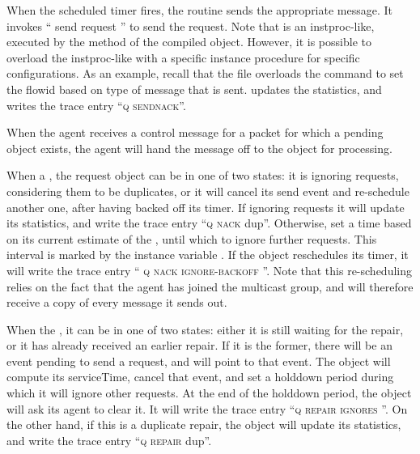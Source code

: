 {When the scheduled timer fires, the routine
sends the appropriate message.
It invokes `` send request '' to send the request.
Note that  is an instproc-like,
executed by the  method of the compiled object.
However, it is possible to overload the instproc-like
with a specific instance procedure 
for specific configurations.
As an example, recall that the file 
overloads the  command
to set the flowid based on type of message that is sent.
 updates the statistics, and writes the trace entry
``\textsc{q sendnack}''.

When the agent receives a control message for a packet
for which a pending object exists,
the agent will hand the message off to the object for processing.
\begin{list}{}{}
\item When a 
  ,
  the request object can be in one of two states:
  it is ignoring requests, considering them to be duplicates, or
  it will cancel its send event and re-schedule another one,
  after having backed off its timer.
  If ignoring requests it will update its statistics,
  and write the trace entry ``\textsc{q nack } dup''.
  Otherwise, set a time based on its current estimate of the ,
  until which to ignore further requests.
  This interval is marked by the instance variable .
  If the object reschedules its timer, it will write the trace entry
  ``\textsc{ q nack ignore-backoff } ''.
  Note that this re-scheduling relies on the fact that
  the agent has joined the multicast group, and will therefore
  receive a copy of every message it sends out.
  
\item When the
  ,
  it can be in one of two states:
  either it is still waiting for the repair,
  or it has already received an earlier repair.
  If it is the former, there will be an event pending
  to send a request, and  will point to that event.
  The object will compute its serviceTime, cancel that event,
  and set a holddown period during which it will ignore 
  other requests.
  At the end of the holddown period, the object will ask its
  agent to clear it.
  It will write the trace entry ``\textsc{q repair ignores } ''.
  On the other hand, if this is a duplicate repair,
  the object will update its statistics, and write the trace entry
  ``\textsc{q repair } dup''.
\end{list}

}
